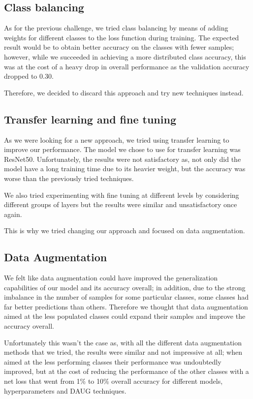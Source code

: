 \documentclass[11pt]{report}
\begin{document}
\subsection{Class balancing}
As for the previous challenge, we tried class balancing by means of adding weights for different classes to the loss function during training.
The expected result would be to obtain better accuracy on the classes with fewer samples; however, while we succeeded in achieving a more distributed class accuracy, this was at the cost of a heavy drop in overall performance as the validation accuracy dropped to 0.30.

Therefore, we decided to discard this approach and try new techniques instead.

\subsection{Transfer learning and fine tuning}
As we were looking for a new approach, we tried using transfer learning to improve our performance.
The model we chose to use for transfer learning was ResNet50.
Unfortunately, the results were not satisfactory as, not only did the model have a long training time due to its heavier weight, but the accuracy was worse than the previously tried techniques.

We also tried experimenting with fine tuning at different levels by considering different groups of layers but the results were similar and unsatisfactory once again.

This is why we tried changing our approach and focused on data augmentation.

\subsection{Data Augmentation}
We felt like data augmentation could have improved the generalization capabilities of our model and its accuracy overall; in addition, due to the strong imbalance in the number of samples for some particular classes, some classes had far better predictions than others.
Therefore we thought that data augmentation aimed at the less populated classes could expand their samples and improve the accuracy overall.

Unfortunately this wasn’t the case as, with all the different data augmentation methods that we tried, the results were similar and not impressive at all; when aimed at the less performing classes their performance was undoubtedly improved, but at the cost of reducing the performance of the other classes with a net loss that went from 1\% to 10\% overall accuracy for different models, hyperparameters and DAUG techniques.
\end{document}
